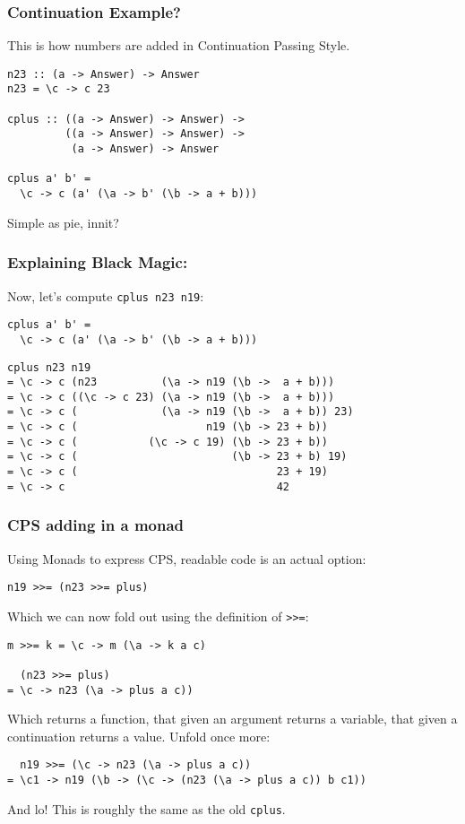 \documentclass{beamer}
\begin{document}
\begin{frame}[fragile]
\frametitle{Continuation Example?}
\lstset{basicstyle=\footnotesize\ttfamily}
This is how numbers are added in Continuation Passing Style.
\begin{lstlisting}
n23 :: (a -> Answer) -> Answer
n23 = \c -> c 23

cplus :: ((a -> Answer) -> Answer) -> 
         ((a -> Answer) -> Answer) -> 
          (a -> Answer) -> Answer
          
cplus a' b' = 
  \c -> c (a' (\a -> b' (\b -> a + b)))
\end{lstlisting}
\pause Simple as pie, innit?
\end{frame}

\begin{frame}[fragile]
\frametitle{Explaining Black Magic:}
\lstset{basicstyle=\footnotesize\ttfamily}
Now, let's compute \texttt{cplus n23 n19}: 
\begin{lstlisting}
cplus a' b' = 
  \c -> c (a' (\a -> b' (\b -> a + b)))
\end{lstlisting}
\pause
\begin{lstlisting}
cplus n23 n19
= \c -> c (n23          (\a -> n19 (\b ->  a + b))) 
= \c -> c ((\c -> c 23) (\a -> n19 (\b ->  a + b)))
= \c -> c (             (\a -> n19 (\b ->  a + b)) 23)
= \c -> c (                    n19 (\b -> 23 + b))
= \c -> c (           (\c -> c 19) (\b -> 23 + b))
= \c -> c (                        (\b -> 23 + b) 19)
= \c -> c (                               23 + 19)
= \c -> c                                 42
\end{lstlisting}
\lstset{language=Haskell}


\end{frame}



\begin{frame}[fragile]
\frametitle{CPS adding in a monad}
Using Monads to express CPS, readable code is an actual option:

\begin{lstlisting}
n19 >>= (n23 >>= plus)
\end{lstlisting}
Which we can now fold out using the definition of \texttt{>>=}:
\pause
\begin{lstlisting}
m >>= k = \c -> m (\a -> k a c)

  (n23 >>= plus)
= \c -> n23 (\a -> plus a c))
\end{lstlisting}
Which returns a function, that given an argument returns a variable, that
given a continuation returns a value. Unfold once more:
\pause
\begin{lstlisting}
  n19 >>= (\c -> n23 (\a -> plus a c))
= \c1 -> n19 (\b -> (\c -> (n23 (\a -> plus a c)) b c1))
\end{lstlisting}

\pause And lo! This is roughly the same as the old \texttt{cplus}.
\end{frame}
\end{document}
